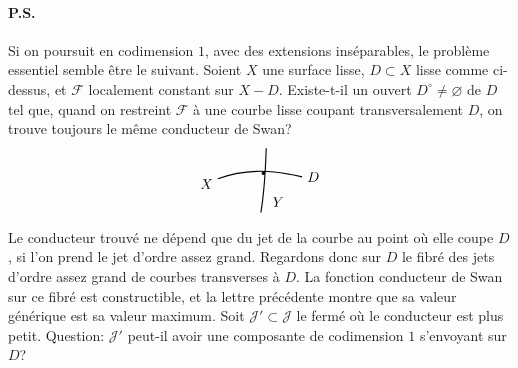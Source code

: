 \documentclass[11pt]{article}
\newcommand{\jetSketch}{%
\begin{tikzpicture}[scale=.9,baseline=-.5ex]
  \draw[thick] (-.25,.2) .. controls (.45,.45) and (1.15,.48) .. (2.1,.25) node[right]{$D$};
  \draw[thick] (.95,-.75) .. controls (1.05,-.15) and (1.08,.45) .. (1.1,1.05);
  \node[right] at (1.14,-.45){$Y$};
  \node[left] at (-.25,.05){$X$};
  \fill (1.02,.35) circle (1.4pt);
\end{tikzpicture}%
}
\newcommand{\F}{\mathcal F}
\begin{document}
\paragraph{P.S.}
Si on poursuit en codimension \(1\), avec des extensions inséparables, le problème essentiel semble être le suivant. Soient \(X\) une surface lisse, \(D\subset X\) lisse comme ci-dessus, et \(\F\) localement constant sur \(X-D\). Existe-t-il un ouvert \(D^\circ\ne\varnothing\) de \(D\) tel que, quand on restreint \(\F\) à une courbe lisse coupant transversalement \(D\), on trouve toujours le même conducteur de Swan?
\[
\jetSketch
\]

Le conducteur trouvé ne dépend que du jet de la courbe au point où elle coupe \(D\), si l'on prend le jet d'ordre assez grand. Regardons donc sur \(D\) le fibré des jets d'ordre assez grand de courbes transverses à \(D\). La fonction conducteur de Swan sur ce fibré est constructible, et la lettre précédente montre que sa valeur générique est sa valeur maximum. Soit \(\mathcal J'\subset\mathcal J\) le fermé où le conducteur est plus petit. Question: \(\mathcal J'\) peut-il avoir une composante de codimension \(1\) s'envoyant sur \(D\)?
\end{document}
